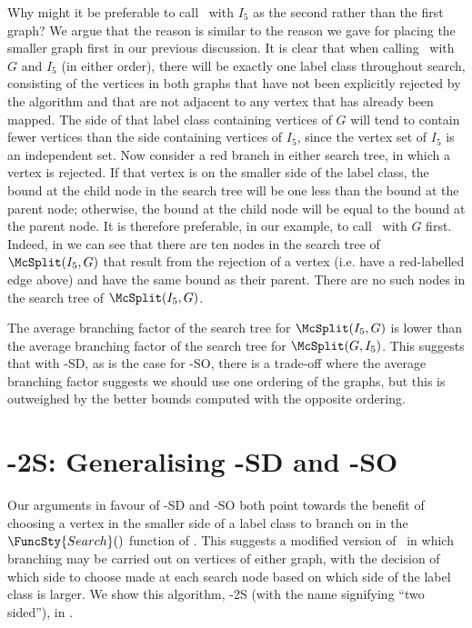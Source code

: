 Why might it be preferable to call \McSplit\ with $I_5$ as the second
rather than the first graph?  We argue
that the reason is similar to the reason we gave for placing the smaller graph
first in our previous discussion.  It is clear that when calling \McSplit\ with
$G$ and $I_5$ (in either order), there will be exactly one label class throughout
search, consisting of the vertices in both graphs that have not been explicitly
rejected by the algorithm and that are not adjacent to any vertex that has already
been mapped.  The side of that label class containing vertices of $G$ will tend to
contain fewer vertices than the side containing vertices of $I_5$, since the vertex set of $I_5$ is
an independent set.  
Now consider a red branch in either search tree, in which a vertex is rejected.
If that vertex is on the smaller side of the label class, the bound at the child node
in the search tree will be one less than the bound at the parent node; otherwise,
the bound at the child node will be equal to the bound at the parent node.  It is
therefore preferable, in our example, to call \McSplit\ with $G$ first.  Indeed,
in  we can see that there are ten
nodes in the search tree of $\McSplit(I_5, G)$ that result from the rejection of
a vertex (i.e. have a red-labelled edge above) and have the same bound as their
parent.  There are no such nodes in the search tree of $\McSplit(I_5, G)$.

The average branching factor of the search tree for $\McSplit(I_5, G)$ is lower
than the average branching factor of the search tree for $\McSplit(G, I_5)$.  This
suggests that with \McSplit-SD, as is the case for \McSplit-SO, there is a trade-off
where the average branching factor suggests we should use one ordering of the
graphs, but this is outweighed by the better bounds computed with the opposite
ordering.

\section{\McSplit-2S: Generalising \McSplit-SD and \McSplit-SO}\label{sec:mcsplit2}

Our arguments in favour of \McSplit-SD and \McSplit-SO both point towards the
benefit of choosing a vertex in the smaller side of a label class to branch on
in the $\FuncSty{Search}()$ function of \McSplit.  This suggests a modified
version of \McSplit\ in which branching may be carried out on vertices of
either graph, with the decision of which side to choose made at each search
node based on which side of the label class is larger.  We show this
algorithm, \McSplit-2S (with the name signifying ``two sided''), in
.

